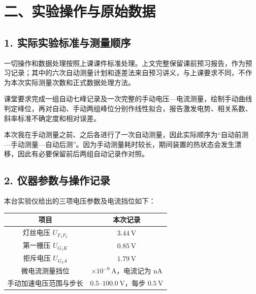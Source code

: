 \clearpage

\section*{二、实验操作与原始数据}

\subsection*{1. 实际实验标准与测量顺序}

一切操作和数据处理按照上课课件标准处理。上文完整保留课前预习报告，作为预习记录；其中的六次自动测量计划和逐差法来自预习讲义，与上课要求不同，不作为本次实际测量次数和正式数据处理方法。

课堂要求完成一组自动七峰记录及一次完整的手动电压—电流测量，绘制手动曲线判定峰位，再对自动、手动两组峰位分别作线性拟合，报告激发电势、相关系数、斜率标准不确定度和相对误差。

本次我在手动测量之前、之后各进行了一次自动测量，因此实际顺序为“自动前测—手动测量—自动后测”。因为手动测量耗时较长，期间装置的热状态会发生漂移，因此有必要保留前后两组自动记录作对照。

\subsection*{2. 仪器参数与操作记录}

本台实验仪给出的三项电压参数及电流挡位如下：

\begin{center}
\begin{minipage}{\linewidth}
\centering

{\small
\setlength{\tabcolsep}{6pt}
\renewcommand{\arraystretch}{1.15}
\begin{tabular}{cc}
\toprule

项目 & 本次记录 \\

\midrule

灯丝电压 $U_{F_1F_2}$ & $3.44\ \mathrm V$ \\

第一栅压 $U_{G_1K}$ & $0.85\ \mathrm V$ \\

拒斥电压 $U_{G_2A}$ & $1.79\ \mathrm V$ \\

微电流测量挡位 & $\times10^{-9}\ \mathrm A$，电流记为 nA \\

手动加速电压范围与步长 & $0.5\text{--}100.0\ \mathrm V$，每步 $0.5\ \mathrm V$ \\

\bottomrule

\end{tabular}
}

\end{minipage}
\end{center}

